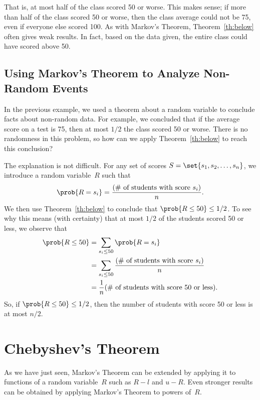 That is, at most half of the class scored 50 or worse.  This makes
sense; if more than half of the class scored 50 or worse, then the
class average could not be 75, even if everyone else scored 100.  As
with Markov's Theorem, Theorem~\ref{th:below} often gives weak
results.  In fact, based on the data given, the entire class could
have scored above 50.

\subsection{Using Markov's Theorem to Analyze Non-Random Events}

In the previous example, we used a theorem about a random variable to
conclude facts about non-random data.  For example, we concluded that
if the average score on a test is 75, then at most $1/2$ the class
scored 50 or worse.  There is no randomness in this problem, so how
can we apply Theorem~\ref{th:below} to reach this conclusion?

The explanation is not difficult.  For any set of scores $S =
\set{s_1, s_2, \dots, s_n}$, we introduce a random variable~$R$ such
that
\[
\prob{R = s_i} = \frac{\text{(\# of students with score $s_i$)}}{n}.
\]
We then use Theorem~\ref{th:below} to conclude that $\prob{R \leq 50}
\leq 1/2$.  To see why this means (with certainty) that at most
$1/2$ of the students scored 50 or less, we observe that
\begin{align*}
\prob{R \leq 50}
    & = \sum_{s_i \leq 50} \prob{R = s_i} \\
    & = \sum_{s_i \leq 50} \frac{\text{(\# of students with score $s_i$)}}{n} \\
    & = \frac{1}{n} \text{(\# of students with score 50 or less)}.
\end{align*}
So, if $\prob{R \leq 50} \leq 1/2$, then the number of students
with score 50 or less is at most $n/2$.

\begin{problems}

\classproblems
{}

\end{problems}

\section{Chebyshev's Theorem}

As we have just seen, Markov's Theorem can be extended by applying it
to functions of a random variable~$R$ such as $R - l$ and $u - R$.
Even stronger results can be obtained by applying Markov's Theorem to
powers of~$R$.


